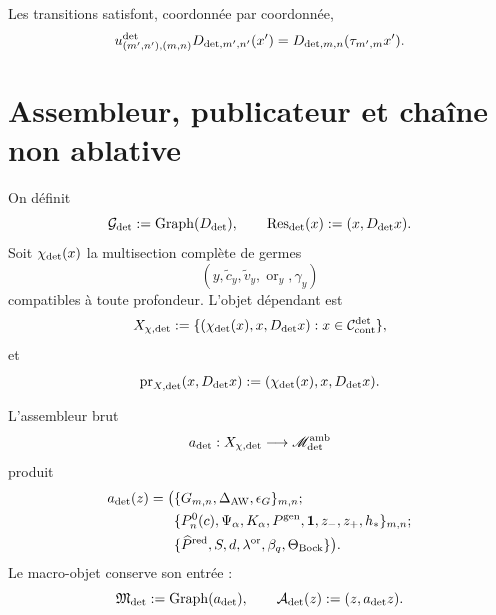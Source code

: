 Les transitions satisfont, coordonnée par coordonnée,
\begin{equation}\label{eq:detint-naturalidad-trece}
 u^{\rm det}_{(m',n'),(m,n)}D_{{\rm det},m',n'}(x')
 =D_{{\rm det},m,n}(\tau_{m',m}x').
\end{equation}

\section{Assembleur, publicateur et chaîne non ablative}

On définit
\begin{equation}\label{eq:detint-graph-d}
 \mathcal G_{\rm det}:=\operatorname{Graph}(D_{\rm det}),
 \qquad
 \operatorname{Res}_{\rm det}(x):=(x,D_{\rm det}x).
\end{equation}
Soit \(\chi_{\rm det}(x)\) la multisection complète de germes
\[
 (y,\widetilde c_y,\widetilde v_y,\operatorname{or}_y,\gamma_y)
\]
compatibles à toute profondeur. L'objet dépendant est
\begin{equation}\label{eq:detint-x-dependiente}
 X_{\chi,{\rm det}}
 :=\{(\chi_{\rm det}(x),x,D_{\rm det}x):
 x\in\mathcal C_{\rm cont}^{\rm det}\},
\end{equation}
et
\begin{equation}\label{eq:detint-prx}
 \operatorname{pr}_{X,{\rm det}}(x,D_{\rm det}x)
 :=(\chi_{\rm det}(x),x,D_{\rm det}x).
\end{equation}

L'assembleur brut
\begin{equation}\label{eq:detint-ensamblador-crudo}
 a_{\rm det}:X_{\chi,{\rm det}}\longrightarrow
 \mathscr M_{\rm det}^{\rm amb}
\end{equation}
produit
\begin{equation}\label{eq:detint-ensamblador-salida}
\begin{split}
 a_{\rm det}(z)=\bigl(&
 \{G_{m,n},\Delta_{\rm AW},\epsilon_G\}_{m,n};\\
 &\{P_n^0(c),\Psi_\alpha,K_\alpha,P^{\rm gen},
 \mathbf1,z_-,z_+,h_*\}_{m,n};\\
 &\{\widehat P^{\rm red},S,d,\lambda^{\rm or},
 \beta_q,\Theta_{\rm Bock}\}\bigr).
\end{split}
\end{equation}
Le macro-objet conserve son entrée :
\begin{equation}\label{eq:detint-graph-a}
 \mathfrak M_{\rm det}:=\operatorname{Graph}(a_{\rm det}),
 \qquad
 \mathcal A_{\rm det}(z):=(z,a_{\rm det}z).
\end{equation}

